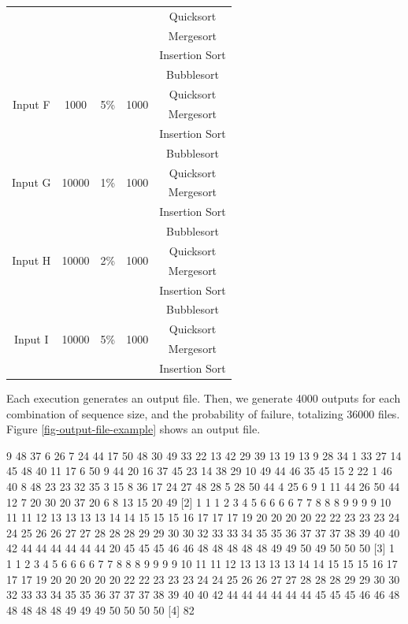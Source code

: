 \begin{table}[H]
\begin{center}
\begin{tabular}{|c|c|c|c|c|}
    & & & & Quicksort \\
    & & & & Mergesort \\
    & & & & Insertion Sort \\
    \hline
    \multirow{4}{*}{Input F} & \multirow{4}{*}{1000} & \multirow{4}{*}{5\%} & \multirow{4}{*}{1000} & Bubblesort \\ 
    & & & & Quicksort \\
    & & & & Mergesort \\
    & & & & Insertion Sort \\
    \hline
    \multirow{4}{*}{Input G} & \multirow{4}{*}{10000} & \multirow{4}{*}{1\%} & \multirow{4}{*}{1000} & Bubblesort \\ 
    & & & & Quicksort \\
    & & & & Mergesort \\
    & & & & Insertion Sort \\
    \hline
    \multirow{4}{*}{Input H} & \multirow{4}{*}{10000} & \multirow{4}{*}{2\%} & \multirow{4}{*}{1000} & Bubblesort \\ 
    & & & & Quicksort \\
    & & & & Mergesort \\
    & & & & Insertion Sort \\
    \hline
    \multirow{4}{*}{Input I} & \multirow{4}{*}{10000} & \multirow{4}{*}{5\%} & \multirow{4}{*}{1000} & Bubblesort \\ 
    & & & & Quicksort \\
    & & & & Mergesort \\
    & & & & Insertion Sort \\
    \hline
    \end{tabular}
    \label{table-input-data}
    \end{center}
\end{table}

Each execution generates an output file. Then, we generate 4000 outputs for each combination of sequence size, and the probability of failure, totalizing 36000 files. Figure \ref{fig-output-file-example} shows an output file.

\begin{verbbox}[\mbox{}]
[1]  9 48 37 6 26 7 24 44 17 50 48 30 49 33 22 13 42 29 39 13 19 13 9 28 34 1
33 27 14 45 48 40 11 17 6 50 9 44 20 16 37 45 23 14 38 29 10 49 44 46 35 45  
15 2 22 1 46 40 8 48 23 23 32 35 3 15 8 36 17 24 27 48 28 5 28 50 44 4 25 6 9
1 11 44 26 50 44 12 7 20 30 20 37 20 6 8 13 15 20 49
[2]  1 1 1 2 3 4 5 6 6 6 6 7 7 8 8 8 9 9 9 9 10 11 11 12 13 13 13 13 14 14 15 
15 15 16 17 17 17 19 20 20 20 20 22 22 23 23 23 24 24 25 26 26 27 27 28 28 28 
29 29 30 30 32 33 33 34 35 35 36 37 37 37 38 39 40 40 42 44 44 44 44 44 44 20 
45 45 45 46 46 48 48 48 48 48 49 49 50 49 50 50 50
[3]  1 1 1 2 3 4 5 6 6 6 6 7 7 8 8 8 9 9 9 9 10 11 11 12 13 13 13 13 14 14 15 
15 15 16 17 17 17 19 20 20 20 20 20 22 22 23 23 23 24 24 25 26 26 27 27 28 28 
28 29 29 30 30 32 33 33 34 35 35 36 37 37 37 38 39 40 40 42 44 44 44 44 44 44 
45 45 45 46 46 48 48 48 48 48 49 49 49 50 50 50 50
[4]  82
\end{verbbox}
    
